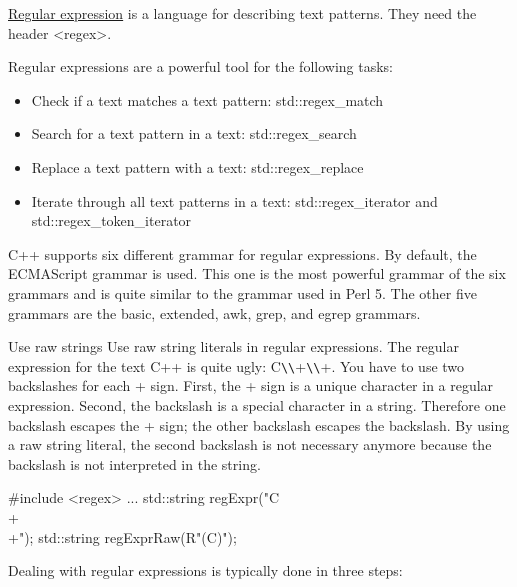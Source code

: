 
\href{http://en.cppreference.com/w/cpp/regex}{Regular expression} is a language for describing text patterns. They need the header <regex>.

Regular expressions are a powerful tool for the following tasks:

\begin{itemize}
\item 
Check if a text matches a text pattern: std::regex\_match

\item 
Search for a text pattern in a text: std::regex\_search

\item 
Replace a text pattern with a text: std::regex\_replace

\item 
Iterate through all text patterns in a text: std::regex\_iterator and std::regex\_token\_iterator
\end{itemize}

C++ supports six different grammar for regular expressions. By default, the ECMAScript grammar is used. This one is the most powerful grammar of the six grammars and is quite similar to the grammar used in Perl 5. The other five grammars are the basic, extended, awk, grep, and egrep grammars.

\begin{myTip}{Use raw strings}
Use raw string literals in regular expressions. The regular expression for the text C++ is quite ugly: C\verb|\\|+\verb|\\|+. You have to use two backslashes for each + sign. First, the + sign is a unique character in a regular expression. Second, the backslash is a special character in a string. Therefore one backslash escapes the + sign; the other backslash escapes the backslash. By using a raw string literal, the second backslash is not necessary anymore because the backslash is not interpreted in the string.

\begin{cpp}
#include <regex>
...
std::string regExpr("C\\+\\+");
std::string regExprRaw(R"(C\+\+)");
\end{cpp}

\end{myTip}

Dealing with regular expressions is typically done in three steps:

